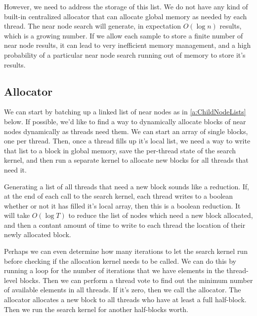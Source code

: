 However, we need to address the storage of this list. We do not have any kind of built-in centralized allocator that can allocate global memory as needed by each thread. The near node search will generate, in expectation $O(\log n)$ results, which is a growing number. If we allow each sample to store a finite number of near node results, it can lead to very inefficient memory management, and a high probability of a particular near node search running out of memory to store it's results. 

\subsection{Allocator}
We can start by batching up a linked list of near nodes as in  \ref{a:ChildNodeLists} below. If possible, we'd like to find a way to dynamically allocate blocks of near nodes dynamically as threads need them. We can start an array of single blocks, one per thread. Then, once a thread fills up it's local list, we need a way to write that list to a block in global memory, save the per-thread state of the search kernel, and then run a separate kernel to allocate new blocks for all threads that need it. 

Generating a list of all threads that need a new block sounds like a reduction. If, at the end of each call to the search kernel, each thread writes to a boolean whether or not it has filled it's local array, then this is a boolean reduction. It will take $O(\log T)$ to reduce the list of nodes which need a new block allocated, and then a contant amount of time to write to each thread the location of their newly allocated block. 

\begin{figure}[H]
\begin{centering}
    \texttt{[image: \\figfile\{fig/near\_list\_allocator]}}
    \caption{Near List Allocator}
    \label{fig:near_alloc}
\end{centering} 
\end{figure}

Perhaps we can even determine how many iterations to let the search kernel run before checking if the allocation kernel needs to be called. We can do this by running a loop for the number of iterations that we have elements in the thread-level blocks. Then we can perform a thread vote to find out the minimum number of available elements in all threads. If it's zero, then we call the allocator. The allocator allocates a new block to all threads who have at least a full half-block. Then we run the search kernel for another half-blocks worth.

